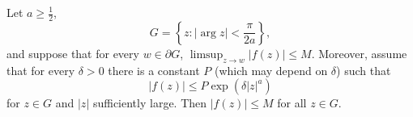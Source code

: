 Let $a \geq \frac{1}{2}$,
\[
G = \left\{ z : |\arg z| < \frac{\pi}{2a} \right\},
\]
and suppose that for every $w \in \partial G$, $\limsup_{z \to w} |f(z)| \leq M$. Moreover, assume that for every $\delta > 0$ there is a constant $P$ (which may depend on $\delta$) such that
\[
|f(z)| \leq P \exp(\delta |z|^a)
\]
for $z \in G$ and $|z|$ sufficiently large. Then $|f(z)| \leq M$ for all $z \in G$.
